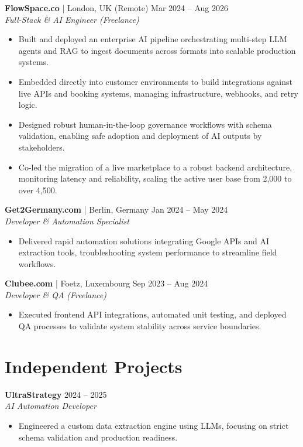 \documentclass[11pt,a4paper]{article}
\begin{document}
\noindent
\textbf{FlowSpace.co} | London, UK (Remote) \hfill Mar 2024 -- Aug 2026 \\
\textit{Full-Stack \& AI Engineer (Freelance)}
\begin{itemize}[leftmargin=*,noitemsep]
\item Built and deployed an enterprise AI pipeline orchestrating multi-step LLM agents and RAG to ingest documents across formats into scalable production systems.
\item Embedded directly into customer environments to build integrations against live APIs and booking systems, managing infrastructure, webhooks, and retry logic.
\item Designed robust human-in-the-loop governance workflows with schema validation, enabling safe adoption and deployment of AI outputs by stakeholders.
\item Co-led the migration of a live marketplace to a robust backend architecture, monitoring latency and reliability, scaling the active user base from 2,000 to over 4,500.
\end{itemize}

\vspace{0.5em}
\noindent
\textbf{Get2Germany.com} | Berlin, Germany \hfill Jan 2024 -- May 2024 \\
\textit{Developer \& Automation Specialist}
\begin{itemize}[leftmargin=*,noitemsep]
\item Delivered rapid automation solutions integrating Google APIs and AI extraction tools, troubleshooting system performance to streamline field workflows.
\end{itemize}

\vspace{0.5em}
\noindent
\textbf{Clubee.com} | Foetz, Luxembourg \hfill Sep 2023 -- Aug 2024 \\
\textit{Developer \& QA (Freelance)}
\begin{itemize}[leftmargin=*,noitemsep]
\item Executed frontend API integrations, automated unit testing, and deployed QA processes to validate system stability across service boundaries.
\end{itemize}

\section{Independent Projects}

\noindent
\textbf{UltraStrategy} \hfill 2024 -- 2025 \\
\textit{AI Automation Developer}
\begin{itemize}[leftmargin=*,noitemsep]
\item Engineered a custom data extraction engine using LLMs, focusing on strict schema validation and production readiness.
\end{itemize}
\end{document}
